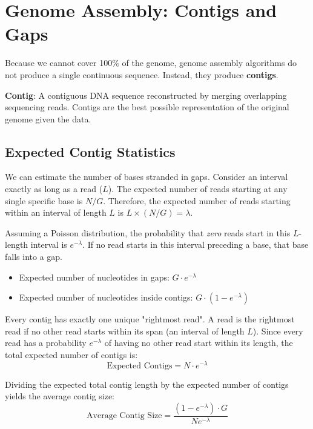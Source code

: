 \documentclass[11pt,a4paper]{article}
\newenvironment{important}{
    \vspace{1em}
    \begin{tcolorbox}[colback=blue!5!white, colframe=blue!75!black, boxrule=1pt, arc=4pt, left=10pt, right=10pt, top=10pt, bottom=10pt]
}{
    \end{tcolorbox}
    \vspace{1em}
}
\begin{document}
\section{Genome Assembly: Contigs and Gaps}

Because we cannot cover 100\% of the genome, genome assembly algorithms do not produce a single continuous sequence. Instead, they produce \textbf{contigs}.

\begin{important}
\textbf{Contig}: A contiguous DNA sequence reconstructed by merging overlapping sequencing reads. Contigs are the best possible representation of the original genome given the data.
\end{important}


\subsection{Expected Contig Statistics}
We can estimate the number of bases stranded in gaps. Consider an interval exactly as long as a read ($L$). The expected number of reads starting at any single specific base is $N/G$. Therefore, the expected number of reads starting within an interval of length $L$ is $L \times (N/G) = \lambda$. 

Assuming a Poisson distribution, the probability that \textit{zero} reads start in this $L$-length interval is $e^{-\lambda}$. If no read starts in this interval preceding a base, that base falls into a gap.
\begin{itemize}
    \item Expected number of nucleotides in gaps: $G \cdot e^{-\lambda}$
    \item Expected number of nucleotides inside contigs: $G \cdot (1 - e^{-\lambda})$
\end{itemize}

Every contig has exactly one unique "rightmost read". A read is the rightmost read if no other read starts within its span (an interval of length $L$). Since every read has a probability $e^{-\lambda}$ of having no other read start within its length, the total expected number of contigs is:
\[ \text{Expected Contigs} = N \cdot e^{-\lambda} \]

Dividing the expected total contig length by the expected number of contigs yields the average contig size:
\[ \text{Average Contig Size} = \frac{(1 - e^{-\lambda}) \cdot G}{N e^{-\lambda}} \]
\end{document}
